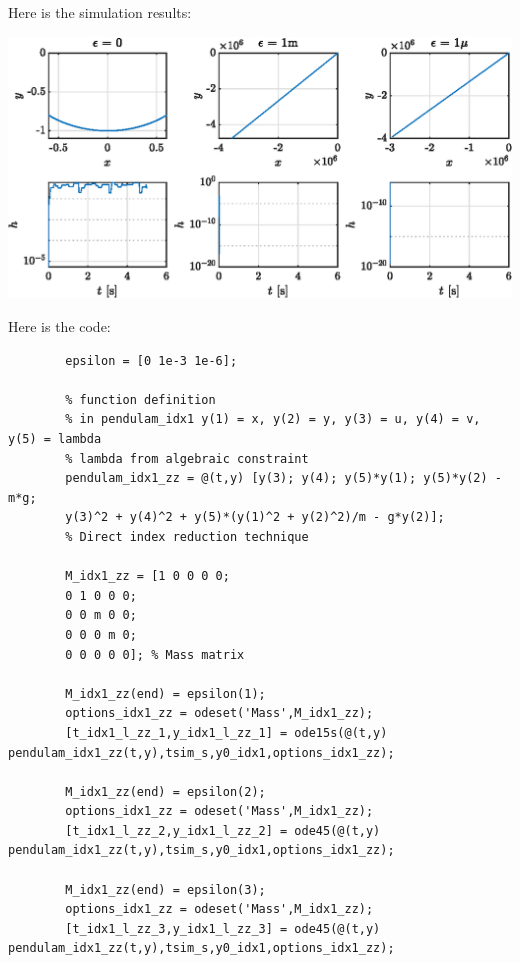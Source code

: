 \begin{enumerate}
	Here is the simulation results:
	
	\includegraphics[width=0.55\textheight]{Figures/Ugf2_14d.eps}
	
	Here is the code:
	
	\begin{lstlisting}
		epsilon = [0 1e-3 1e-6]; 
		
		% function definition
		% in pendulam_idx1 y(1) = x, y(2) = y, y(3) = u, y(4) = v, y(5) = lambda
		% lambda from algebraic constraint
		pendulam_idx1_zz = @(t,y) [y(3); y(4); y(5)*y(1); y(5)*y(2) - m*g;
		y(3)^2 + y(4)^2 + y(5)*(y(1)^2 + y(2)^2)/m - g*y(2)]; 
		% Direct index reduction technique
		
		M_idx1_zz = [1 0 0 0 0;
		0 1 0 0 0;
		0 0 m 0 0;
		0 0 0 m 0;
		0 0 0 0 0]; % Mass matrix
		
		M_idx1_zz(end) = epsilon(1);
		options_idx1_zz = odeset('Mass',M_idx1_zz); 
		[t_idx1_l_zz_1,y_idx1_l_zz_1] = ode15s(@(t,y) pendulam_idx1_zz(t,y),tsim_s,y0_idx1,options_idx1_zz);
		
		M_idx1_zz(end) = epsilon(2);
		options_idx1_zz = odeset('Mass',M_idx1_zz); 
		[t_idx1_l_zz_2,y_idx1_l_zz_2] = ode45(@(t,y) pendulam_idx1_zz(t,y),tsim_s,y0_idx1,options_idx1_zz);
		
		M_idx1_zz(end) = epsilon(3);
		options_idx1_zz = odeset('Mass',M_idx1_zz); 
		[t_idx1_l_zz_3,y_idx1_l_zz_3] = ode45(@(t,y) pendulam_idx1_zz(t,y),tsim_s,y0_idx1,options_idx1_zz);
	\end{lstlisting}
\end{enumerate}